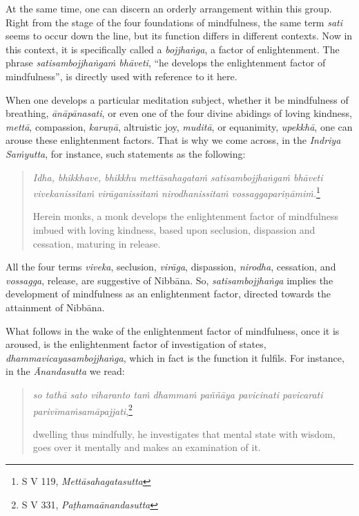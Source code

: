 At the same time, one can discern an orderly arrangement within this group. Right from the stage of the four foundations of mindfulness, the same term \emph{sati} seems to occur down the line, but its function differs in different contexts. Now in this context, it is specifically called a \emph{bojjhaṅga}, a factor of enlightenment. The phrase \emph{satisambojjhaṅgaṁ bhāveti}, ``he develops the enlightenment factor of mindfulness'', is directly used with reference to it here.

When one develops a particular meditation subject, whether it be mindfulness of breathing, \emph{ānāpānasati}, or even one of the four divine abidings of loving kindness, \emph{mettā}, compassion, \emph{karuṇā}, altruistic joy, \emph{muditā}, or equanimity, \emph{upekkhā}, one can arouse these enlightenment factors. That is why we come across, in the \emph{Indriya Saṁyutta}, for instance, such statements as the following:

\begin{quote}
\emph{Idha, bhikkhave, bhikkhu mettāsahagataṁ satisambojjhaṅgaṁ bhāveti vivekanissitaṁ virāganissitaṁ nirodhanissitaṁ vossaggapariṇāmiṁ.}\footnote{S V 119, \emph{Mettāsahagatasutta}}

Herein monks, a monk develops the enlightenment factor of mindfulness imbued with loving kindness, based upon seclusion, dispassion and cessation, maturing in release.
\end{quote}

All the four terms \emph{viveka}, seclusion, \emph{virāga}, dispassion, \emph{nirodha}, cessation, and \emph{vossagga}, release, are suggestive of Nibbāna. So, \emph{satisambojjhaṅga} implies the development of mindfulness as an enlightenment factor, directed towards the attainment of Nibbāna.

What follows in the wake of the enlightenment factor of mindfulness, once it is aroused, is the enlightenment factor of investigation of states, \emph{dhammavicayasambojjhaṅga}, which in fact is the function it fulfils. For instance, in the \emph{Ānandasutta} we read:

\begin{quote}
\emph{so tathā sato viharanto taṁ dhammaṁ paññāya pavicinati pavicarati parivīmaṁsamāpajjati},\footnote{S V 331, \emph{Paṭhamaānandasutta}}

dwelling thus mindfully, he investigates that mental state with wisdom, goes over it mentally and makes an examination of it.
\end{quote}

